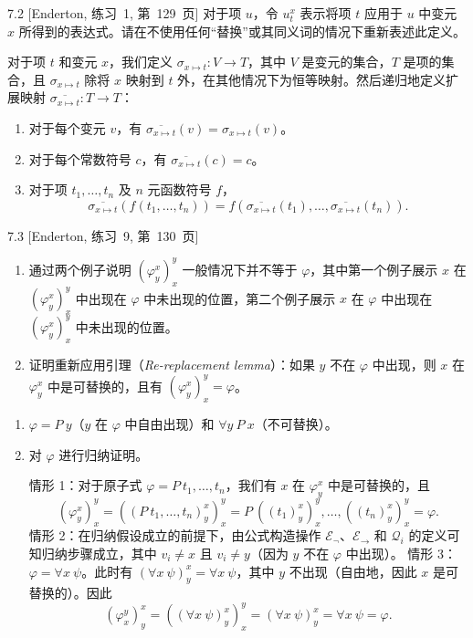 \begin{exercise}{7.2}
  [Enderton, 练习~1, 第~129~页]
  对于项 $u$，令 $u_t^x$ 表示将项 $t$ 应用于 $u$ 中变元 $x$ 所得到的表达式。请在不使用任何“替换”或其同义词的情况下重新表述此定义。
\end{exercise}

对于项 $t$ 和变元 $x$，我们定义 $\sigma_{x\mapsto t}:V\rightarrow T$，其中 $V$ 是变元的集合，$T$ 是项的集合，且 $\sigma_{x\mapsto t}$ 除将 $x$ 映射到 $t$ 外，在其他情况下为恒等映射。然后递归地定义扩展映射 $\overline{\sigma_{x\mapsto t}}:T\rightarrow T$：
\begin{enumerate}
  \item 对于每个变元 $v$，有 $\overline{\sigma_{x\mapsto t}}(v)=\sigma_{x\mapsto t}(v)$。
  \item 对于每个常数符号 $c$，有 $\overline{\sigma_{x\mapsto t}}(c)=c$。
  \item 对于项 $t_1,\dots,t_n$ 及 $n$ 元函数符号 $f$，
        \[\overline{\sigma_{x\mapsto t}}(f(t_1,\dots,t_n))=f(\overline{\sigma_{x\mapsto t}}(t_1),\dots,\overline{\sigma_{x\mapsto t}}(t_n)).\]
\end{enumerate}

\begin{exercise}{7.3}
  [Enderton, 练习~9, 第~130~页]
  \begin{enumerate}[label=(\alph*)]
    \item 通过两个例子说明 $(\varphi_y^x)_x^y$ 一般情况下并不等于 $\varphi$，其中第一个例子展示 $x$ 在 $(\varphi_y^x)_x^y$ 中出现在 $\varphi$ 中未出现的位置，第二个例子展示 $x$ 在 $\varphi$ 中出现在 $(\varphi_y^x)_x^y$ 中未出现的位置。
    \item 证明重新应用引理（\textit{Re-replacement lemma}）：如果 $y$ 不在 $\varphi$ 中出现，则 $x$ 在 $\varphi_y^x$ 中是可替换的，且有 $(\varphi_y^x)_x^y=\varphi$。\qedhere
  \end{enumerate}
\end{exercise}

\begin{enumerate}[label=(\alph*)]
  \item $\varphi=P\ y$（$y$ 在 $\varphi$ 中自由出现）和 $\forall y\ P\ x$（不可替换）。
  \item
        对 $\varphi$ 进行归纳证明。

        情形 1：对于原子式 $\varphi=P\ t_1,\dots,t_n$，我们有 $x$ 在 $\varphi_y^x$ 中是可替换的，且
        \[
          (\varphi_y^x)_x^y = ((P\ t_1,\dots,t_n)_y^x)_x^y = P\ ((t_1)_y^x)_x^y,\dots,((t_n)_y^x)_x^y=\varphi.
        \]
        情形 2：在归纳假设成立的前提下，由公式构造操作 $\mathcal{E}_{\neg}$、$\mathcal{E}_{\rightarrow}$ 和 $\mathcal{Q}_i$ 的定义可知归纳步骤成立，其中 $v_i\neq x$ 且 $v_i\neq y$（因为 $y$ 不在 $\varphi$ 中出现）。
        \newline
        情形 3：$\varphi=\forall x\ \psi$。此时有 $(\forall x\ \psi)_y^x=\forall x\ \psi$，其中 $y$ 不出现（自由地，因此 $x$ 是可替换的）。因此
        \[
          (\varphi_x^y)_y^x=((\forall x\ \psi)_y^x)_x^y=(\forall x\ \psi)_y^x=\forall x\ \psi=\varphi.
        \]
\end{enumerate}
